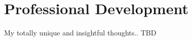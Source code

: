 \pagestyle{plain}
\chapter[Professional Development][Professional Development]{Professional Development}


My totally unique and insightful thoughts.. TBD